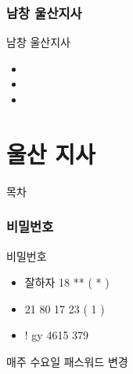 \documentclass[aspectratio=1610,17pt,xcolor=pdftex,dvipsnames,table,handout]{beamer}
\begin{document}
		\section{ 남창 울산지사  }
		\frame [plain] {\sectionpage}

		\begin{frame} [t,plain]
			\begin{block} { 남창 울산지사 }
			\begin{itemize}
				\item  
  				\item  
				\item  
			\end{itemize}
			\end{block}
		\end{frame}




		\part{울산 지사}
		\frame{\partpage}


		\begin{frame} [plain]{목차}
		\tableofcontents
		\end{frame}
		

		\section{비밀번호}
		\frame [plain] {\sectionpage}

		\begin{frame} [t,plain]
			\begin{block} {비밀번호}
			\begin{itemize}
				\item 잘하자 18 ** ( * )
  				\item 21 80 17 23 ( 1 )
				\item ! gy 4615 379 
			\end{itemize}
			매주 수요일 패스워드 변경 
			\end{block}
		\end{frame}
\end{document}
